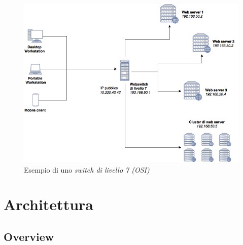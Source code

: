 \documentclass[italian]{tktltiki2}
\begin{document}
\begin{figure}
\centering
\includegraphics[width=\textwidth]{images/switch7}
\caption{Esempio di uno \emph{switch di livello 7 (OSI)}}
\end{figure}

\newpage
\section{Architettura}
\label{sec:architecture}

\subsection{Overview}
\label{ssec:overview}
\end{document}
